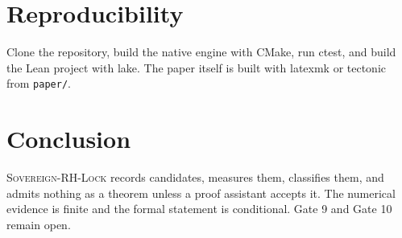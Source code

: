 \documentclass[11pt,letterpaper]{article}
\newcommand{\code}[1]{\texttt{#1}}
\begin{document}
\section{Reproducibility}
\label{sec:repro}

Clone the repository, build the native engine with CMake, run ctest, and build the Lean project with lake. The paper itself is built with latexmk or tectonic from \code{paper/}.

\section{Conclusion}

\textsc{Sovereign-RH-Lock} records candidates, measures them, classifies them, and admits nothing as a theorem unless a proof assistant accepts it. The numerical evidence is finite and the formal statement is conditional. Gate 9 and Gate 10 remain open.



\end{document}
